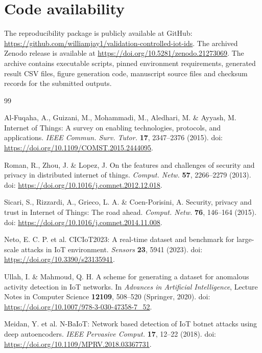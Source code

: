 \documentclass[fleqn,10pt]{wlscirep}
\begin{document}
\section*{Code availability}

The reproducibility package is publicly available at GitHub: \url{https://github.com/williamjay1/validation-controlled-iot-ids}. The archived Zenodo release is available at \url{https://doi.org/10.5281/zenodo.21273069}. The archive contains executable scripts, pinned environment requirements, generated result CSV files, figure generation code, manuscript source files and checksum records for the submitted outputs.


\begin{thebibliography}{99}

Al-Fuqaha, A., Guizani, M., Mohammadi, M., Aledhari, M. \& Ayyash, M. Internet of Things: A survey on enabling technologies, protocols, and applications. \emph{IEEE Commun. Surv. Tutor.} \textbf{17}, 2347--2376 (2015). doi: \url{https://doi.org/10.1109/COMST.2015.2444095}.

Roman, R., Zhou, J. \& Lopez, J. On the features and challenges of security and privacy in distributed internet of things. \emph{Comput. Netw.} \textbf{57}, 2266--2279 (2013). doi: \url{https://doi.org/10.1016/j.comnet.2012.12.018}.

Sicari, S., Rizzardi, A., Grieco, L. A. \& Coen-Porisini, A. Security, privacy and trust in Internet of Things: The road ahead. \emph{Comput. Netw.} \textbf{76}, 146--164 (2015). doi: \url{https://doi.org/10.1016/j.comnet.2014.11.008}.

Neto, E. C. P. et al. CICIoT2023: A real-time dataset and benchmark for large-scale attacks in IoT environment. \emph{Sensors} \textbf{23}, 5941 (2023). doi: \url{https://doi.org/10.3390/s23135941}.

Ullah, I. \& Mahmoud, Q. H. A scheme for generating a dataset for anomalous activity detection in IoT networks. In \emph{Advances in Artificial Intelligence}, Lecture Notes in Computer Science \textbf{12109}, 508--520 (Springer, 2020). doi: \url{https://doi.org/10.1007/978-3-030-47358-7_52}.

Meidan, Y. et al. N-BaIoT: Network based detection of IoT botnet attacks using deep autoencoders. \emph{IEEE Pervasive Comput.} \textbf{17}, 12--22 (2018). doi: \url{https://doi.org/10.1109/MPRV.2018.03367731}.


\end{thebibliography}
\end{document}
